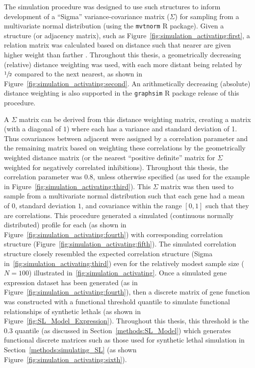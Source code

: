 The simulation procedure was designed to use such  structures to inform development of a ``Sigma'' variance-covariance matrix ($\Sigma$) for sampling from a multivariate normal distribution (using the \texttt{mvtnorm} R package). Given a  structure (or adjacency matrix), such as Figure~\ref{fig:simulation_activating:first}, a relation matrix was calculated based on distance such that nearer  are given higher weight than farther . Throughout this thesis, a geometrically decreasing (relative) distance weighting was used, with each more distant  being related by $\sfrac{1}{2}$ compared to the next nearest, as shown in Figure~\ref{fig:simulation_activating:second}. An arithmetically decreasing (absolute) distance weighting is also supported in the \texttt{graphsim} R package release of this procedure.

A $\Sigma$ matrix can be derived from this distance weighting matrix, creating a matrix (with a diagonal of $1$) where each  has a variance and standard deviation of 1. Thus covariances between adjacent  were assigned by a correlation parameter and the remaining matrix based on weighting these correlations by the geometrically weighted distance matrix (or the nearest ``positive definite'' matrix for $\Sigma$ weighted for negatively correlated inhibitions). Throughout this thesis, the correlation parameter was $0.8$, unless otherwise specified (as used for the example in Figure~\ref{fig:simulation_activating:third}). This $\Sigma$ matrix was then used to sample from a multivariate normal distribution such that each gene had a mean of $0$, standard deviation $1$, and covariance within the range $[0,1]$ such that they are correlations. This procedure generated a simulated (continuous normally distributed)  profile for each  (as shown in Figure~\ref{fig:simulation_activating:fourth}) with corresponding correlation structure (Figure~\ref{fig:simulation_activating:fifth}). The simulated correlation structure closely resembled the expected correlation structure (Sigma in~\ref{fig:simulation_activating:third}) even for the relatively modest sample size ($N=100$) illustrated in~\ref{fig:simulation_activating}. Once a simulated \gls{gene expression} dataset has been generated (as in Figure~\ref{fig:simulation_activating:fourth}), then a discrete matrix of gene function was constructed with a functional threshold quantile to simulate functional relationships of \glspl{synthetic lethal} (as shown in Figure~\ref{fig:SL_Model_Expression}). Throughout this thesis, this threshold is the 0.3 quantile (as discussed in Section~\ref{methods:SL_Model}) which generates functional discrete matrices such as those used for \gls{synthetic lethal} simulation in Section~\ref{methods:simulating_SL} (as shown Figure~\ref{fig:simulation_activating:sixth}).

